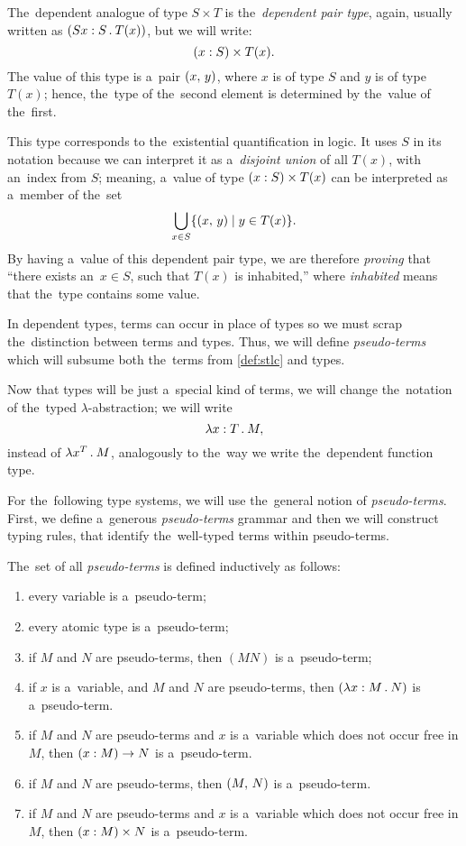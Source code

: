 The~dependent analogue of type $S \times T$ is the~\emph{dependent pair type},
again, usually written as ${(S x \overset{}: S \, . \: T(x))}$, but we will write:
\[
  (x \overset{}: S) \times T(x).
\]
The value of this type is a~pair $(x, \, y)$, where $x$ is of type $S$ and $y$
is of type $T(x)$; hence, the~type of the~second element is determined by
the~value of the~first.

This type corresponds to the~existential quantification in logic. It uses $S$ in
its notation because we can interpret it as a~\emph{disjoint union} of all
$T(x)$, with an~index from $S$; meaning, a~value of type $(x \overset{}: S) \times
T(x)$ can be interpreted as a~member of the~set
\[
  \bigcup_{x \in S} \{ (x, \, y) \mid y \in T(x) \}.
\]
By having a~value of this dependent pair type, we are therefore \emph{proving}
that ``there exists an~$x \in S$, such that $T(x)$ is inhabited,'' where
\emph{inhabited} means that the~type contains some value.

In dependent types, terms can occur in place of types so we must scrap
the~distinction between terms and types. Thus, we will define
\emph{pseudo-terms} which will subsume both the~terms from \autoref{def:stlc}
and types.

Now that types will be just a~special kind of terms, we will change the~notation
of the~typed $\lambda$-abstraction; we will write
\[
  \lambda x \overset{}: T \, . \: M,
\]
instead of $\lambda x^T \, . \: M$, analogously to the~way we write the~dependent
function type.


For the~following type systems, we will use the~general notion of
\emph{pseudo-terms}. First, we define a~generous \emph{pseudo-terms} grammar and
then we will construct typing rules, that identify the~well-typed terms within
pseudo-terms.

\begin{definition}\label{def:pseudo-term}
  The~set of all \emph{pseudo-terms} is defined inductively as follows:
  \begin{enumerate}
    \item every variable is a~pseudo-term;
    \item every atomic type is a~pseudo-term;
    \item if $M$ and $N$ are pseudo-terms, then $(M N)$ is a~pseudo-term;
    \item if $x$ is a~variable, and $M$ and $N$ are pseudo-terms, then
      $(\lambda x \overset{}: M \, . \: N)$ is a~pseudo-term.
    \item if $M$ and $N$ are pseudo-terms and $x$ is a~variable which does not
      occur free in $M$, then $(x : M) \to N$ is a~pseudo-term.
    \item if $M$ and $N$ are pseudo-terms, then $(M, \, N)$ is a~pseudo-term.
    \item if $M$ and $N$ are pseudo-terms and $x$ is a~variable which does not
      occur free in $M$, then $(x \overset{}: M) \times N$ is a~pseudo-term.
  \end{enumerate}
\end{definition}

